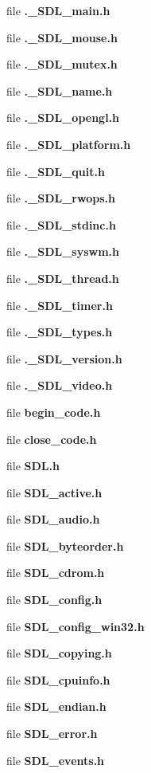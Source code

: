 \begin{DoxyCompactItemize}
\item 
file {\bfseries .\+\_\+\+S\+D\+L\+\_\+main.\+h}
\item 
file {\bfseries .\+\_\+\+S\+D\+L\+\_\+mouse.\+h}
\item 
file {\bfseries .\+\_\+\+S\+D\+L\+\_\+mutex.\+h}
\item 
file {\bfseries .\+\_\+\+S\+D\+L\+\_\+name.\+h}
\item 
file {\bfseries .\+\_\+\+S\+D\+L\+\_\+opengl.\+h}
\item 
file {\bfseries .\+\_\+\+S\+D\+L\+\_\+platform.\+h}
\item 
file {\bfseries .\+\_\+\+S\+D\+L\+\_\+quit.\+h}
\item 
file {\bfseries .\+\_\+\+S\+D\+L\+\_\+rwops.\+h}
\item 
file {\bfseries .\+\_\+\+S\+D\+L\+\_\+stdinc.\+h}
\item 
file {\bfseries .\+\_\+\+S\+D\+L\+\_\+syswm.\+h}
\item 
file {\bfseries .\+\_\+\+S\+D\+L\+\_\+thread.\+h}
\item 
file {\bfseries .\+\_\+\+S\+D\+L\+\_\+timer.\+h}
\item 
file {\bfseries .\+\_\+\+S\+D\+L\+\_\+types.\+h}
\item 
file {\bfseries .\+\_\+\+S\+D\+L\+\_\+version.\+h}
\item 
file {\bfseries .\+\_\+\+S\+D\+L\+\_\+video.\+h}
\item 
file {\bf begin\+\_\+code.\+h}
\item 
file {\bf close\+\_\+code.\+h}
\item 
file {\bf S\+D\+L.\+h}
\item 
file {\bf S\+D\+L\+\_\+active.\+h}
\item 
file {\bf S\+D\+L\+\_\+audio.\+h}
\item 
file {\bf S\+D\+L\+\_\+byteorder.\+h}
\item 
file {\bf S\+D\+L\+\_\+cdrom.\+h}
\item 
file {\bfseries S\+D\+L\+\_\+config.\+h}
\item 
file {\bfseries S\+D\+L\+\_\+config\+\_\+win32.\+h}
\item 
file {\bfseries S\+D\+L\+\_\+copying.\+h}
\item 
file {\bf S\+D\+L\+\_\+cpuinfo.\+h}
\item 
file {\bf S\+D\+L\+\_\+endian.\+h}
\item 
file {\bf S\+D\+L\+\_\+error.\+h}
\item 
file {\bf S\+D\+L\+\_\+events.\+h}

\end{DoxyCompactItemize}
